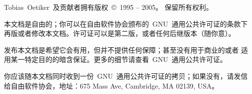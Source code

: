 \pagebreak
\begin{small}
   Tobias\ Oetiker~及贡献者拥有版权~\copyright\ 1995 -- 2005。
   保留所有权利。

   本文档是自由的；你可以在自由软件协会颁布的~GNU~通用公共许可证的条款下
   再版或者修改本文档。许可证可以是第二版，或者任何后继版本（随你意）。

   发布本文档是希望它会有用，但并不提供任何保障；甚至没有用于商业的或者
   适用某一特定目的的暗含保证。更多的细节请查看~GNU~通用公共许可证。

   你应该随本文档同时收到一份~GNU~通用公共许可证的拷贝；如果没有，请发信
   给自由软件协会，地址：675 Mass Ave, Cambridge, MA 02139, USA。

\end{small}


\endinput

%

